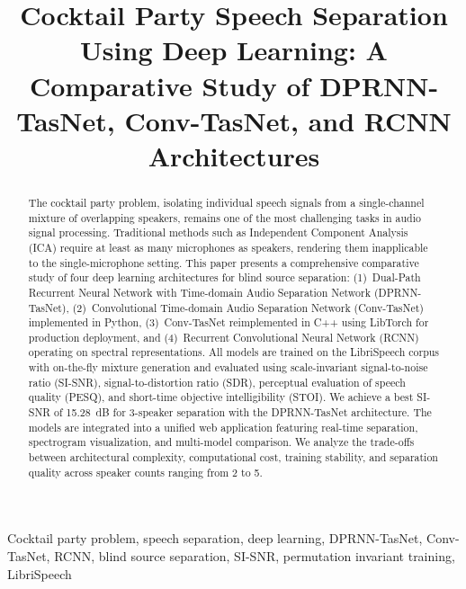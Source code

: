 \documentclass[conference]{IEEEtran}
\begin{document}
\title{Cocktail Party Speech Separation Using Deep Learning: A Comparative Study of DPRNN-TasNet, Conv-TasNet, and RCNN Architectures}

\author{
}

\maketitle

\begin{abstract}
The cocktail party problem, isolating individual speech signals from a single-channel mixture of overlapping speakers, remains one of the most challenging tasks in audio signal processing. Traditional methods such as Independent Component Analysis (ICA) require at least as many microphones as speakers, rendering them inapplicable to the single-microphone setting. This paper presents a comprehensive comparative study of four deep learning architectures for blind source separation: (1)~Dual-Path Recurrent Neural Network with Time-domain Audio Separation Network (DPRNN-TasNet), (2)~Convolutional Time-domain Audio Separation Network (Conv-TasNet) implemented in Python, (3)~Conv-TasNet reimplemented in C++ using LibTorch for production deployment, and (4)~Recurrent Convolutional Neural Network (RCNN) operating on spectral representations. All models are trained on the LibriSpeech corpus with on-the-fly mixture generation and evaluated using scale-invariant signal-to-noise ratio (SI-SNR), signal-to-distortion ratio (SDR), perceptual evaluation of speech quality (PESQ), and short-time objective intelligibility (STOI). We achieve a best SI-SNR of 15.28~dB for 3-speaker separation with the DPRNN-TasNet architecture. The models are integrated into a unified web application featuring real-time separation, spectrogram visualization, and multi-model comparison. We analyze the trade-offs between architectural complexity, computational cost, training stability, and separation quality across speaker counts ranging from 2 to 5.
\end{abstract}

\begin{IEEEkeywords}
Cocktail party problem, speech separation, deep learning, DPRNN-TasNet, Conv-TasNet, RCNN, blind source separation, SI-SNR, permutation invariant training, LibriSpeech
\end{IEEEkeywords}
\end{document}
